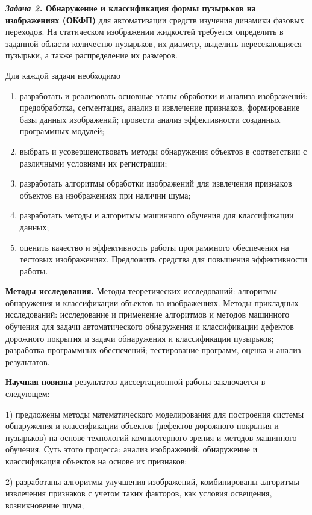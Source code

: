 \textbf{\textit{Задача 2.} Обнаружение и классификация формы пузырьков на изображениях (ОКФП)} для автоматизации средств изучения динамики фазовых переходов.  На статическом изображении жидкостей требуется определить в заданной области количество пузырьков, их диаметр, выделить пересекающиеся пузырьки, а также распределение их размеров.

Для каждой задачи необходимо
\begin{enumerate}
\item разработать и реализовать основные этапы обработки и анализа
  изображений: предобработка, сегментация, анализ и извлечение
  признаков, формирование базы данных изображений; провести анализ
  эффективности созданных программных модулей;
\item выбрать и усовершенствовать методы обнаружения объектов в соответствии с различными условиями их регистрации;
\item разработать алгоритмы обработки изображений для извлечения признаков объектов на изображениях при наличии шума;
\item разработать методы и алгоритмы машинного обучения для классификации данных;
\item оценить качество и эффективность работы программного обеспечения на тестовых изображениях. Предложить средства для повышения эффективности работы.
\end{enumerate}

\textbf{Методы исследования.} Методы теоретических исследований: алгоритмы обнаружения и классификации объектов на изображениях. Методы прикладных исследований: исследование и применение алгоритмов и методов машинного обучения для  задачи автоматического обнаружения и классификации дефектов дорожного покрытия и задачи обнаружения и классификации пузырьков; разработка программных обеспечений; тестирование программ, оценка и анализ результатов.

\textbf{Научная новизна} результатов диссертационной работы заключается в следующем:

1) предложены методы математического моделирования для построения системы обнаружения и классификации объектов (дефектов дорожного покрытия и пузырьков) на основе технологий компьютерного зрения и методов машинного обучения. Суть этого процесса: анализ изображений, обнаружение и классификация объектов на основе их признаков;

2) разработаны алгоритмы улучшения изображений, комбинированы алгоритмы извлечения признаков с учетом таких факторов, как условия освещения, возникновение шума;

